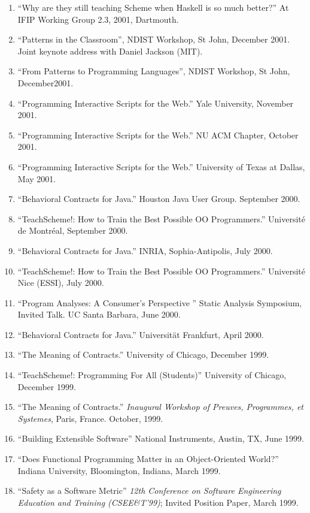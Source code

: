 \begin{enumerate}
\item ``Why are they still teaching Scheme when Haskell is so much
better?'' At IFIP Working Group 2.3, 2001, Dartmouth. 
\item ``Patterns in the Classroom'', NDIST Workshop, St John, December
2001. Joint keynote address with Daniel Jackson (MIT). 
\item ``From Patterns to Programming Languages'', NDIST Workshop, St John,
December2001.  
\item ``Programming Interactive Scripts for the Web.'' Yale University,
November 2001.  
\item ``Programming Interactive Scripts for the Web.'' NU ACM Chapter, October
2001.  
\item ``Programming Interactive Scripts for the Web.'' University of Texas at
Dallas, May 2001.  

\item{}``Behavioral Contracts for Java.'' Houston Java User Group. September 2000. 
\item{}``TeachScheme!: How to Train the Best Possible OO Programmers.''
Universit{\'e} de Montr\'eal, September 2000. 
\item{}``Behavioral Contracts for Java.'' INRIA, Sophia-Antipolis, July 2000. 
\item{}``TeachScheme!: How to Train the Best Possible OO Programmers.''
Universit{\'e} Nice (ESSI), July 2000. 
\item{}``Program Analyses: A Consumer's Perspective '' Static Analysis
Symposium, Invited Talk. UC Santa Barbara, June 2000. 
\item{}``Behavioral Contracts for Java.'' Universit{\"a}t Frankfurt, April 2000. 

\item{}``The Meaning of Contracts.'' University of Chicago, December 1999. 
\item{}``TeachScheme!: Programming For All (Students)''
 University of Chicago, December 1999. 
\item{}``The Meaning of Contracts.''
 {\em Inaugural Workshop of Preuves, Programmes, et Systemes\/}, Paris, 
 France. October, 1999. 
\item{}``Building Extensible Software''
 National Instruments, Austin, TX, June 1999. 
\item{}``Does Functional Programming Matter in an Object-Oriented World?''
 Indiana University, Bloomington, Indiana, March 1999.
\item{}``Safety as a Software Metric''
 {\em 12th Conference on Software Engineering
 Education and Training \rm(CSEE\&T'99)}; Invited Position Paper,
 March 1999.


\end{enumerate}
